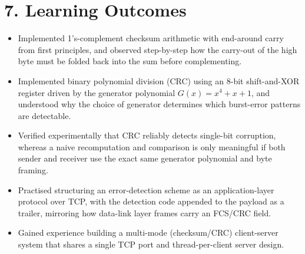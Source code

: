 \documentclass[11pt]{article}
\begin{document}
\section*{7. Learning Outcomes}
\begin{itemize}
  \item Implemented 1's-complement checksum arithmetic with end-around carry from first
        principles, and observed step-by-step how the carry-out of the high byte must be folded
        back into the sum before complementing.
  \item Implemented binary polynomial division (CRC) using an 8-bit shift-and-XOR register driven
        by the generator polynomial $G(x)=x^4+x+1$, and understood why the choice of generator
        determines which burst-error patterns are detectable.
  \item Verified experimentally that CRC reliably detects single-bit corruption, whereas a naive
        recomputation and comparison is only meaningful if both sender and receiver use the exact
        same generator polynomial and byte framing.
  \item Practised structuring an error-detection scheme as an application-layer protocol over TCP,
        with the detection code appended to the payload as a trailer, mirroring how data-link
        layer frames carry an FCS/CRC field.
  \item Gained experience building a multi-mode (checksum/CRC) client-server system that shares a
        single TCP port and thread-per-client server design.
\end{itemize}
\end{document}

